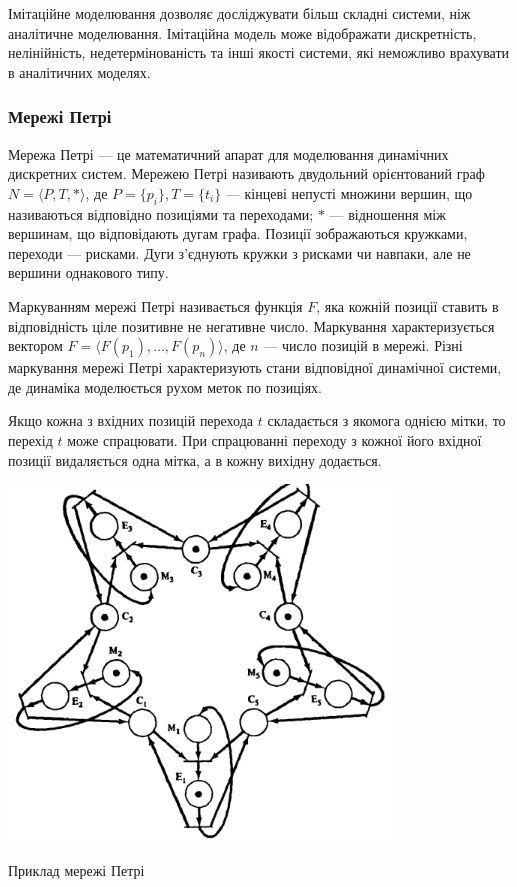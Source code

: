 Імітаційне моделювання дозволяє досліджувати більш складні системи, ніж аналітичне моделювання. Імітаційна модель може відображати дискретність, нелінійність, недетермінованість та інші якості системи, які неможливо врахувати в аналітичних моделях. 

\subsubsection{Мережі Петрі}
Мережа Петрі --- це математичний апарат для моделювання динамічних дискретних систем. Мережею Петрі називають двудольний орієнтований граф \mbox {$ N = \langle P, T, * \rangle $}, де \mbox{$ P = \{p_i\}, T = \{t_i\} $} --- кінцеві непусті множини вершин, що називаються відповідно позиціями та переходами; $*$ --- відношення між вершинам, що відповідають дугам графа. Позиції зображаються кружками, переходи --- рисками. Дуги з’єднують кружки з рисками чи навпаки, але не вершини однакового типу.

Маркуванням мережі Петрі називається функція $F$, яка кожній позиції ставить в відповідність ціле позитивне не негативне число. Маркування характеризується вектором \mbox{$ F = \langle F(p_1), \dots, F(p_n) \rangle $}, де $n$ --- число позицій в мережі.
Різні маркування мережі Петрі характеризують стани відповідної динамічної системи, де динаміка моделюється рухом меток по позиціях.

Якщо кожна з вхідних позицій перехода $t$ складається з якомога однією мітки, то перехід $t$ може спрацювати. При спрацюванні переходу з кожної його вхідної позиції видаляється одна мітка, а в кожну вихідну додається.
            \begin{stdfigure}
                \includegraphics[width=4in]{images/petri_net_example.png}
                \caption{Приклад мережі Петрі}
                \label{fig:petri_net_example}
            \end{stdfigure}   

